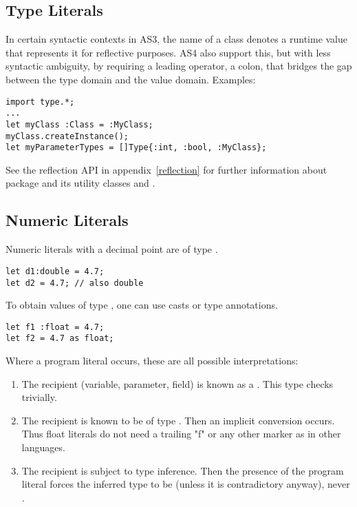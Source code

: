 \subsection{Type Literals}
\label{typeLiterals}
In certain syntactic contexts in AS3, the name of a class denotes a
runtime value that represents it for reflective purposes. AS4 also
support this, but with less syntactic ambiguity, by requiring a leading
operator, a colon, that bridges the gap between the type domain and the value
domain. Examples:
\begin{verbatim}
import type.*;
...
let myClass :Class = :MyClass;
myClass.createInstance();
let myParameterTypes = []Type{:int, :bool, :MyClass};
\end{verbatim}
See the reflection API in appendix~\ref{reflection} for further information
about package  and its utility classes  and .


\subsection{Numeric Literals}
\label{numlit}
Numeric literals with a decimal point are of type .
\begin{verbatim}
let d1:double = 4.7;
let d2 = 4.7; // also double
\end{verbatim}
To obtain values of type , one can use casts or
type annotations.
\begin{verbatim}
let f1 :float = 4.7;
let f2 = 4.7 as float;
\end{verbatim}

Where a  program literal occurs, these are all possible
interpretations:
\begin{enumerate}
  \item The recipient (variable, parameter, field) is known as a
  . This type checks trivially.
  \item The recipient is known to be of type . Then an implicit
  conversion occurs. Thus float literals do not need a trailing "f" or any
  other marker as in other languages.
  \item The recipient is subject to type inference. Then the presence of the
  program literal forces the inferred type to be  (unless it is
  contradictory anyway), never .
\end{enumerate}

